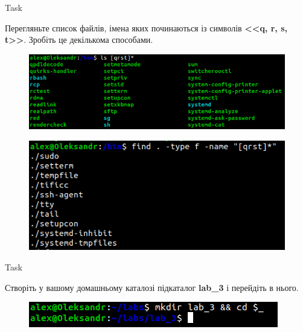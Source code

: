 \documentclass[a4paper,12pt]{article}
\newcommand{\RomanNumeralCaps}[1]{\MakeUppercase{\romannumeral #1}}
\begin{document}
    \begin{center}
        \Large{Task \RomanNumeralCaps{3}}
    \end{center}
    Перегляньте список файлів, імена яких починаються із символів \textbf{<<q, r, s, t>>}. Зробіть це декількома способами.
    \begin{figure}[h!]
        \begin{minipage}[h]{1\linewidth}
            \centering
            \includegraphics[width=0.5\linewidth]{Prt sc/Figure_3_1.png}  
        \end{minipage}
    \end{figure}
    \begin{figure}[h!]
        \begin{minipage}[h]{1\linewidth}
            \centering
            \includegraphics[width=0.5\linewidth]{Prt sc/Figure_3_2.png}  
        \end{minipage}
    \end{figure}

\newpage
    \begin{center}
        \Large{Task \RomanNumeralCaps{4}}
    \end{center}
    Створіть у вашому домашньому каталозі підкаталог \textbf{lab\_3} і перейдіть в нього.
    \begin{figure}[h!]
        \begin{minipage}[h]{1\linewidth}
            \centering
            \includegraphics[width=0.5\linewidth]{Prt sc/Figure_4.png}  
        \end{minipage}
    \end{figure}
\end{document}
